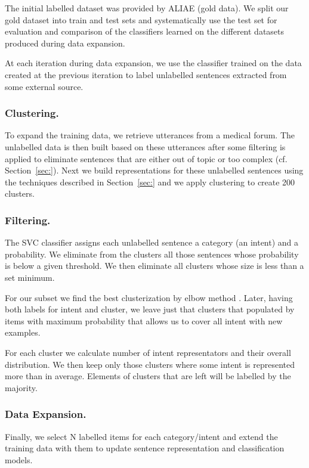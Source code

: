 \documentclass[11pt]{article}
\begin{document}
The initial labelled dataset was provided by ALIAE (gold data). We split our gold dataset into train and test sets and systematically use the test set for evaluation and comparison of the classifiers learned on the different datasets produced during data expansion.

At each iteration during data expansion, we use the classifier trained
on the data created at the previous iteration to label unlabelled
sentences extracted from some external source. 

\subsubsection{Clustering.} To expand the training data, we retrieve utterances from a medical forum. The unlabelled data is then built based on these utterances after some filtering is applied to eliminate sentences that are either out of topic or too complex (cf. Section~\ref{sec:}). Next we build representations for these unlabelled sentences using the techniques described in Section~\ref{sec:} and we apply clustering to create 200 clusters. 

\subsubsection{Filtering.} The SVC classifier assigns each unlabelled sentence a category (an intent) and a probability. We eliminate from the clusters all those sentences whose probability is below a given threshold. We then eliminate all clusters whose size is less than a set minimum. 

For our subset we find the best clusterization by elbow method \cite{elbow_rule}. Later, having both labels for intent and cluster, we leave just that clusters that populated by items with maximum probability that allows us to cover all intent with new examples.

For each cluster we calculate number of intent representators and their overall distribution. We then keep only those clusters where some intent is represented more than in average. Elements of clusters that are left will be labelled by the majority.


\subsubsection{Data Expansion.} Finally, we select N labelled items for each category/intent and extend the training data with them to update sentence representation and classification models.
\end{document}
